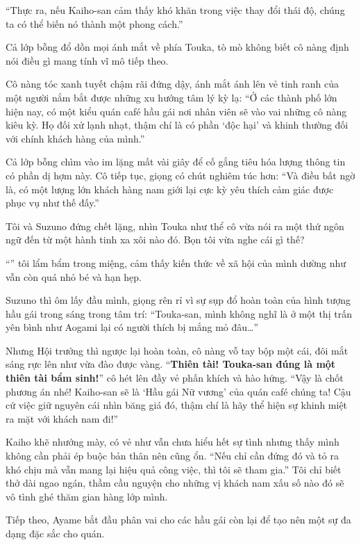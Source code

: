 \documentclass[../main.tex]{subfiles}
\begin{document}
``Thực ra, nếu Kaiho-san cảm thấy khó khăn trong việc thay đổi thái độ, chúng ta có thể biến nó thành một phong cách.''

Cả lớp bỗng đổ dồn mọi ánh mắt về phía Touka, tò mò không biết cô nàng định nói điều gì mang tính vĩ mô tiếp theo.

Cô nàng tóc xanh tuyết chậm rãi đứng dậy, ánh mắt ánh lên vẻ tinh ranh của một người nắm bắt được những xu hướng tâm lý kỳ lạ: ``Ở các thành phố lớn hiện nay, có một kiểu quán café hầu gái nơi nhân viên sẽ vào vai những cô nàng kiêu kỳ. Họ đối xử lạnh nhạt, thậm chí là có phần `độc hại' và khinh thường đối với chính khách hàng của mình.''

Cả lớp bỗng chìm vào im lặng mất vài giây để cố gắng tiêu hóa lượng thông tin có phần dị hợm này. Cô tiếp tục, giọng có chút nghiêm túc hơn: ``Và điều bất ngờ là, có một lượng lớn khách hàng nam giới lại cực kỳ yêu thích cảm giác được phục vụ như thế đấy.''

Tôi và Suzuno đứng chết lặng, nhìn Touka như thể cô vừa nói ra một thứ ngôn ngữ đến từ một hành tinh xa xôi nào đó. Bọn tôi vừa nghe cái gì thế?

``'' tôi lẩm bẩm trong miệng, cảm thấy kiến thức về xã hội của mình dường như vẫn còn quá nhỏ bé và hạn hẹp.

Suzuno thì ôm lấy đầu mình, giọng rên rỉ vì sự sụp đổ hoàn toàn của hình tượng hầu gái trong sáng trong tâm trí: ``Touka-san, mình không nghĩ là ở một thị trấn yên bình như Aogami lại có người thích bị mắng mỏ đâu\dots''

Nhưng Hội trưởng thì ngược lại hoàn toàn, cô nàng vỗ tay bộp một cái, đôi mắt sáng rực lên như vừa đào được vàng. ``\textbf{Thiên tài! Touka-san đúng là một thiên tài bẩm sinh!}'' cô hét lên đầy vẻ phấn khích và hào hứng. ``Vậy là chốt phương án nhé! Kaiho-san sẽ là `Hầu gái Nữ vương' của quán café chúng ta! Cậu cứ việc giữ nguyên cái nhìn băng giá đó, thậm chí là hãy thể hiện sự khinh miệt ra mặt với khách nam đi!''

Kaiho khẽ nhướng mày, có vẻ như vẫn chưa hiểu hết sự tình nhưng thấy mình không cần phải ép buộc bản thân nên cũng ổn.
``Nếu chỉ cần đứng đó và tỏ ra khó chịu mà vẫn mang lại hiệu quả công việc, thì tôi sẽ tham gia.'' Tôi chỉ biết thở dài ngao ngán, thầm cầu nguyện cho những vị khách nam xấu số nào đó sẽ vô tình ghé thăm gian hàng lớp mình.

Tiếp theo, Ayame bắt đầu phân vai cho các hầu gái còn lại để tạo nên một sự đa dạng đặc sắc cho quán.
\end{document}
